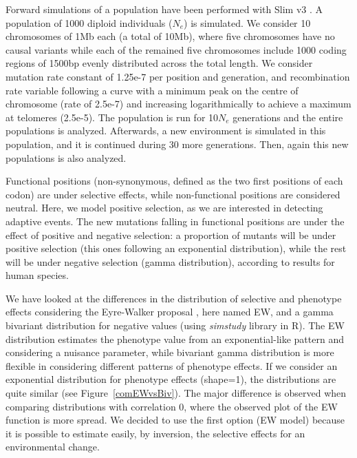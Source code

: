 \documentclass[a4paper,11pt]{article}
\begin{document}
Forward simulations of a population have been performed with Slim v3 \citep{Haller:2019aa}. A population of 1000 diploid individuals ($N_e$) is simulated. We consider 10 chromosomes of 1Mb each (a total of 10Mb), where five chromosomes have no causal variants while each of the remained five chromosomes include 1000 coding regions of 1500bp evenly distributed across the total length. We consider mutation rate constant of 1.25e-7 per position and generation, and recombination rate variable following a curve with a minimum peak on the centre of chromosome (rate of 2.5e-7) and increasing logarithmically to achieve a maximum at telomeres (2.5e-5). The population is run for 10$N_e$ generations and the entire populations is analyzed. Afterwards, a new environment is simulated in this population, and it is continued during 30 more generations. Then, again this new populations is also analyzed.

Functional positions (non-synonymous, defined as the two first positions of each codon) are under selective effects, while non-functional positions are considered neutral. Here, we model positive selection, as we are interested in detecting adaptive events. The new mutations falling in functional positions are under the effect of positive and negative selection: a proportion of mutants will be under positive selection (this ones following an exponential distribution), while the rest will be under negative selection (gamma distribution), according to \citep{Boyko:2008aa} results for human species. 

We have looked at the differences in the distribution of selective and phenotype effects considering the Eyre-Walker proposal \citep{Eyre-Walker:2010aa}, here named EW, and a gamma bivariant distribution \citep{Caballero:2015aa} for negative values (using \textit{simstudy} library in R). The EW distribution estimates the phenotype value from an exponential-like pattern and considering a nuisance parameter, while bivariant gamma distribution is more flexible in considering different patterns of phenotype effects. If we consider an exponential distribution for phenotype effects (shape=1), the distributions are quite similar (see Figure~\ref{comEWvsBiv}). The major difference is observed when comparing distributions with correlation 0, where the observed plot of the EW function is more spread. We decided to use the first option (EW model) because it is possible to estimate easily,  by inversion, the selective effects for an environmental change.
\end{document}
